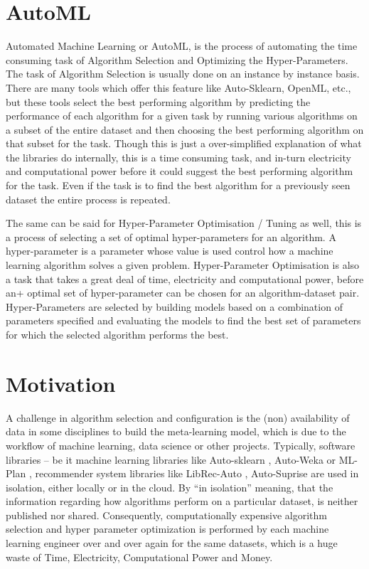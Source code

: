 \section{AutoML}
Automated Machine Learning or AutoML, is the process of automating the time consuming task of Algorithm Selection and Optimizing the Hyper-Parameters. The task of Algorithm Selection is usually done on an instance by instance basis. There are many tools which offer this feature like Auto-Sklearn, OpenML, etc., but these tools select the best performing algorithm by predicting the performance of each algorithm for a given task by running various algorithms on a subset of the entire dataset and then choosing the best performing algorithm on that subset for the task. Though this is just a over-simplified explanation of what the libraries do internally, this is a time consuming task, and in-turn electricity and computational power before it could suggest the best performing algorithm for the task. Even if the task is to find the best algorithm for a previously seen dataset the entire process is repeated.

The same can be said for Hyper-Parameter Optimisation / Tuning as well, this is a process of selecting a set of optimal hyper-parameters for an algorithm. A hyper-parameter is a parameter whose value is used control how a machine learning algorithm solves a given problem. Hyper-Parameter Optimisation is also a task that takes a great deal of time, electricity and computational power, before an+ optimal set of hyper-parameter can be chosen for an algorithm-dataset pair. Hyper-Parameters are selected by building models based on a combination of parameters specified and evaluating the models to find the best set of parameters for which the selected algorithm performs the best.

\section{Motivation}
A challenge in algorithm selection and configuration is the (non) availability of data in some disciplines to build the meta-learning model, which is due to the workflow of machine learning, data science or other projects. Typically, software libraries – be it machine learning libraries like Auto-sklearn \citep{feurer:m}, Auto-Weka \citep{kotthoff:l} or ML-Plan \citep{mohr:f}, recommender system libraries like LibRec-Auto \citep{mansoury:m}, Auto-Suprise \citep{rohan-joeran} are used in isolation, either locally or in the cloud. By “in isolation” meaning, that the information regarding how algorithms perform on a particular dataset, is neither published nor shared. Consequently, computationally expensive algorithm selection and hyper parameter optimization is performed by each machine learning engineer over and over again for the same datasets, which is a huge waste of Time, Electricity, Computational Power and Money.

